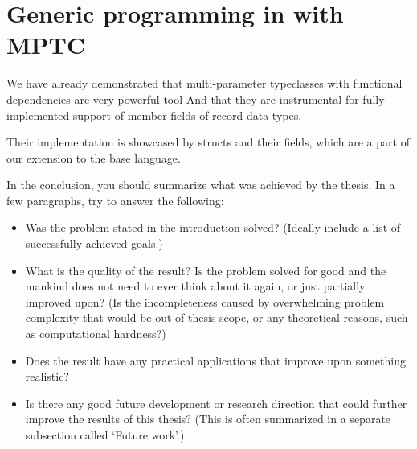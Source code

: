 

\section{Generic programming in \cmm with MPTC}

We have already demonstrated  that multi-parameter typeclasses with functional dependencies are very powerful tool And that they are instrumental for fully implemented support of member fields of record data types.

Their implementation is showcased by structs and their fields, which are a part of our extension to the base \cmm language.

In the conclusion, you should summarize what was achieved by the thesis. In a few paragraphs, try to answer the following:
\begin{itemize}
\item Was the problem stated in the introduction solved? (Ideally include a list of successfully achieved goals.)
\item What is the quality of the result? Is the problem solved for good and the mankind does not need to ever think about it again, or just partially improved upon? (Is the incompleteness caused by overwhelming problem complexity that would be out of thesis scope, or any theoretical reasons, such as computational hardness?)
\item Does the result have any practical applications that improve upon something realistic?
\item Is there any good future development or research direction that could further improve the results of this thesis? (This is often summarized in a separate subsection called `Future work'.)
\end{itemize}
